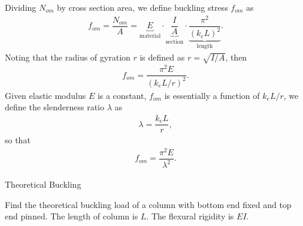 Dividing $N_{om}$ by cross section area, we define buckling stress $f_{om}$ as
\begin{gather*}
f_{om}=\dfrac{N_{om}}{A}=\underbrace{E}_\text{material}\cdot\underbrace{\dfrac{I}{A}}_\text{section}\cdot\underbrace{\dfrac{\pi^2}{\left(k_eL\right)^2}}_\text{length}.
\end{gather*}
Noting that the radius of gyration $r$ is defined as $r=\sqrt{I/A}$, then
\begin{gather*}
f_{om}=\dfrac{\pi^2E}{\left(k_eL/r\right)^2}.
\end{gather*}
Given elastic modulus $E$ is a constant, $f_{om}$ is essentially a function of $k_eL/r$, we define the slenderness ratio $\lambda$ as
\begin{gather*}
\lambda=\dfrac{k_eL}{r},
\end{gather*}
so that
\begin{gather*}
f_{om}=\dfrac{\pi^2E}{\lambda^2}.
\end{gather*}
\begin{exmp}Theoretical Buckling

Find the theoretical buckling load of a column with bottom end fixed and top end pinned. The length of column is $L$. The flexural rigidity is $EI$.
\begin{figure}[H]
\footnotesize

\end{figure}
\end{exmp}
